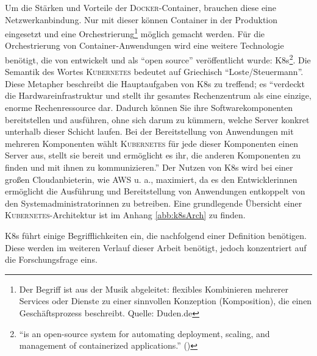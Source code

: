 Um die Stärken und Vorteile der \textsc{Docker}-Container, brauchen diese eine Netzwerkanbindung. Nur mit dieser können Container in der Produktion eingesetzt und eine Orchestrierung\footnote{Der Begriff ist aus der Musik abgeleitet: flexibles Kombinieren mehrerer Services oder Dienste zu einer sinnvollen Konzeption (Komposition), die einen Geschäftsprozess beschreibt. Quelle: Duden.de} möglich gemacht werden. Für die Orchestrierung von Container-Anwendungen wird eine weitere Technologie benötigt, die von \cite{google_llc_production-grade_2020} entwickelt und als \enquote{open source} veröffentlicht wurde: \ac{K8s}\footnote{\enquote{is an open-source system for automating deployment, scaling, and management of containerized applications.} (\cite{google_llc_production-grade_2020})}. Die Semantik des Wortes \textsc{Kubernetes} bedeutet auf Griechisch \enquote{Loste/Steuermann}. Diese Metapher beschreibt die Hauptaufgaben von \ac{K8s} zu treffend; es \enquote{verdeckt die Hardwareinfrastruktur und stellt ihr gesamtes Rechenzentrum als eine einzige, enorme Rechenressource dar. Dadurch können Sie ihre Softwarekomponenten	bereitstellen und ausführen, ohne sich darum zu kümmern, welche Server konkret unterhalb dieser Schicht laufen. Bei der Bereitstellung von Anwendungen mit mehreren Komponenten wählt \textsc{Kubernetes} für jede dieser Komponenten einen Server aus, stellt sie bereit und ermöglicht es ihr, die anderen Komponenten zu finden und mit ihnen zu kommunizieren.}\autocite[][S.4]{luksa_kubernetes_2018} Der Nutzen von \ac{K8s} wird bei einer großen Cloudanbieterin, wie \ac{AWS} u. a., maximiert, da es den Entwicklerinnen ermöglicht die Ausführung und Bereitstellung von Anwendungen entkoppelt von den Systemadministratorinnen zu betreiben.\autocite[vgl.][S.4]{luksa_kubernetes_2018} Eine grundlegende Übersicht einer \textsc{Kubernetes}-Architektur ist im Anhang \vref{abb:k8sArch} zu finden. 
\par
\ac{K8s} führt einige Begrifflichkeiten ein, die nachfolgend einer Definition benötigen. Diese werden im weiteren Verlauf dieser Arbeit benötigt, jedoch konzentriert auf die Forschungsfrage eins.

